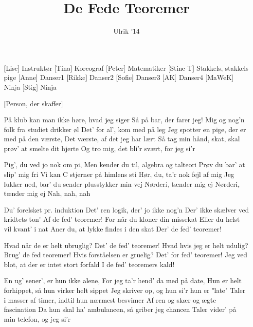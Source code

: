 \documentclass[a4paper,11pt]{article}
\title{De Fede Teoremer}
\author{Ulrik '14}
\begin{document}
\maketitle

\begin{roles}
[Lise] Instruktør
[Tina] Koreograf
[Peter] Matematiker
[Stine T] Stakkels, stakkels pige
[Anne] Danser1
[Rikke] Danser2
[Sofie] Danser3
[AK] Danser4
[MaWeK] Ninja
[Stig] Ninja
\end{roles}

\begin{props}
[Person, der skaffer]
\end{props}


\begin{song}
 På klub kan man ikke høre, hvad jeg siger
   Så på bar, der farer jeg!
   Mig og nog'n folk fra studiet drikker øl
   Det' for al', kom med på leg
   Jeg spotter en pige, der er med på den værste,
   Det værste, af det jeg har lært
   Så tag min hånd, skat, skal prøv' at smelte dit hjerte
   Og tro mig, det bli'r svært, for jeg si'r

 Pig', du ved jo nok om pi,
   Men kender du til, algebra og talteori
   Prøv du bar' at slip' mig fri
   Vi kan C stjerner på himlens sti
 Hør, du, ta'r nok fejl af mig
   Jeg lukker ned, bar’ du sender plusstykker min vej
   Nørderi, tænder mig ej
   Nørderi, tænder mig ej 
   Nah, nah, nah

 Du' forelsket pr. induktion
   Det' ren logik, der' jo ikke nog'n
   Der' ikke skælver ved kridtets ton'
   Af de fed' teoremer!
   For når du kloner din missekat
   Eller du helst vil kvant' i nat
   Aner du, at lykke findes i den skat
   Der' de fed' teoremer!

 Hvad når de er helt ubruglig?
 Det' de fed' teoremer!
 Hvad hvis jeg er helt udulig?
 Brug' de fed teoremer!
 Hvis forståelsen er gruelig?
 Det' for fed' teoremer!
 Jeg ved blot, at der er intet stort forfald
I de fed' teoremers kald!

 En ug' sener', er hun ikke alene,
   For jeg ta'r hend' da med på date,
   Hun er helt forhippet, så hun virker helt sippet   
   Jeg skriver op, og hun si'r hun er "late"
   Taler i masser af timer, indtil hun nærmest besvimer
   Af ren og skær og ægte fascination
   Da hun skal ha' ambulancen, så griber jeg chancen
   Taler vider' på min telefon, og jeg si'r


\end{song}
\end{document}
